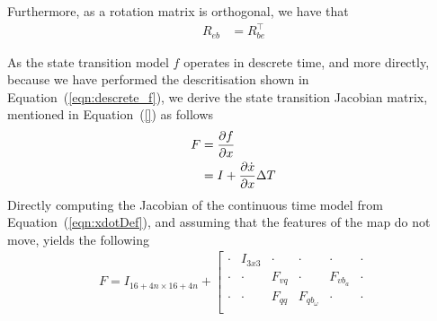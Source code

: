 \documentclass[]{article}
\begin{document}
{Furthermore, as a rotation matrix is orthogonal, we have that
\begin{align}
	R_{eb} &= R_{be}^\top
\end{align}

As the state transition model $f$ operates in descrete time, and more directly, because we have performed the descritisation shown in Equation~(\ref{eqn:descrete_f}), we derive the state transition Jacobian matrix, mentioned in Equation~(\ref{}) as follows
\begin{align}
	F &= \frac{\partial f}{\partial x} \notag \\
	&=
	\label{eqn:descrete_F}
	I + \frac{\partial \dot{x}}{\partial x} \Delta T
\end{align}
Directly computing the Jacobian of the continuous time model from Equation~(\ref{eqn:xdotDef}), and assuming that the features of the map do not move, yields the following
\begin{align}
	F = I_{16+4n \times 16+4n} +
	\left[
	\begin{matrix}
		\cdot 		& I_{3x3} 	& \cdot	 	& \cdot		 	& \cdot		& \cdot \\
		\cdot		& \cdot	 	& F_{vq}	& \cdot		 	& F_{vb_a} 	& \cdot \\
		\cdot		& \cdot	 	& F_{qq}	& F_{qb_\omega}	& \cdot		& \cdot \\

\end{matrix}
\end{align}}
\end{document}
